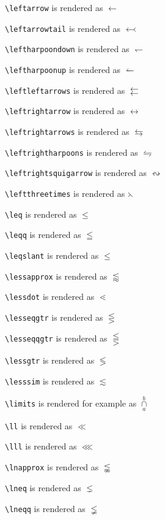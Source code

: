 \texttt{\textbackslash leftarrow} is rendered as $\leftarrow$

\texttt{\textbackslash leftarrowtail} is rendered as $\leftarrowtail$

\texttt{\textbackslash leftharpoondown} is rendered as $\leftharpoondown$

\texttt{\textbackslash leftharpoonup} is rendered as $\leftharpoonup$

\texttt{\textbackslash leftleftarrows} is rendered as $\leftleftarrows$

\texttt{\textbackslash leftrightarrow} is rendered as $\leftrightarrow$

\texttt{\textbackslash leftrightarrows} is rendered as $\leftrightarrows$

\texttt{\textbackslash leftrightharpoons} is rendered as $\leftrightharpoons$

\texttt{\textbackslash leftrightsquigarrow} is rendered as $\leftrightsquigarrow$

\texttt{\textbackslash leftthreetimes} is rendered as $\leftthreetimes$

\texttt{\textbackslash leq} is rendered as $\leq$

\texttt{\textbackslash leqq} is rendered as $\leqq$

\texttt{\textbackslash leqslant} is rendered as $\leqslant$

\texttt{\textbackslash lessapprox} is rendered as $\lessapprox$

\texttt{\textbackslash lessdot} is rendered as $\lessdot$

\texttt{\textbackslash lesseqgtr} is rendered as $\lesseqgtr$

\texttt{\textbackslash lesseqqgtr} is rendered as $\lesseqqgtr$

\texttt{\textbackslash lessgtr} is rendered as $\lessgtr$

\texttt{\textbackslash lesssim} is rendered as $\lesssim$

\texttt{\textbackslash limits} is rendered for example as $\mathop\cap\limits_a^b$

\texttt{\textbackslash ll} is rendered as $\ll$

\texttt{\textbackslash lll} is rendered as $\lll$

\texttt{\textbackslash lnapprox} is rendered as $\lnapprox$

\texttt{\textbackslash lneq} is rendered as $\lneq$

\texttt{\textbackslash lneqq} is rendered as $\lneqq$

